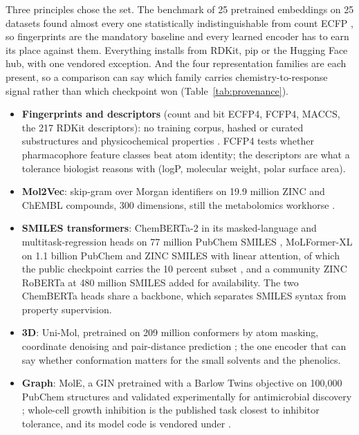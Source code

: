 Three principles chose the set. The benchmark of 25 pretrained embeddings on 25 datasets
found almost every one statistically indistinguishable from count ECFP , so fingerprints are the mandatory baseline and every
learned encoder has to earn its place against them. Everything installs from RDKit, pip or
the Hugging Face hub, with one vendored exception. And the four representation families are
each present, so a comparison can say which family carries chemistry-to-response signal rather
than which checkpoint won (Table~\ref{tab:provenance}).
\begin{itemize}
\item \textbf{Fingerprints and descriptors} (count and bit ECFP4, FCFP4, MACCS, the 217
  RDKit descriptors): no training corpus, hashed or curated substructures and
  physicochemical properties . FCFP4 tests whether pharmacophore
  feature classes beat atom identity; the descriptors are what a tolerance biologist
  reasons with (logP, molecular weight, polar surface area).
\item \textbf{Mol2Vec}: skip-gram over Morgan identifiers on 19.9 million ZINC and ChEMBL
  compounds, 300 dimensions, still the metabolomics workhorse .
\item \textbf{SMILES transformers}: ChemBERTa-2 in its masked-language and
  multitask-regression heads on 77 million PubChem SMILES , MoLFormer-XL on 1.1 billion PubChem and ZINC SMILES with linear
  attention, of which the public checkpoint carries the 10 percent subset , and a community ZINC RoBERTa at
  480 million SMILES added for availability. The two ChemBERTa heads share a backbone,
  which separates SMILES syntax from property supervision.
\item \textbf{3D}: Uni-Mol, pretrained on 209 million conformers by atom masking,
  coordinate denoising and pair-distance prediction ;
  the one encoder that can say whether conformation matters for the small solvents
  and the phenolics.
\item \textbf{Graph}: MolE, a GIN pretrained with a Barlow Twins objective on 100{,}000
  PubChem structures and validated experimentally for antimicrobial discovery
  ; whole-cell
  growth inhibition is the published task closest to inhibitor tolerance, and its
  model code is vendored under .
\end{itemize}

